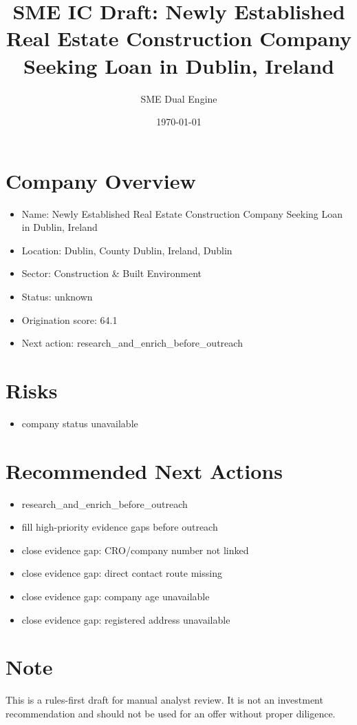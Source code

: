 \documentclass[11pt,a4paper]{article}
\title{SME IC Draft: Newly Established Real Estate Construction Company Seeking Loan in Dublin, Ireland}
\author{SME Dual Engine}
\date{\today}
\begin{document}
\maketitle
\section*{Company Overview}
\begin{itemize}[leftmargin=1.4em]
\item Name: Newly Established Real Estate Construction Company Seeking Loan in Dublin, Ireland
\item Location: Dublin, County Dublin, Ireland, Dublin
\item Sector: Construction \& Built Environment
\item Status: unknown
\item Origination score: 64.1
\item Next action: research\_and\_enrich\_before\_outreach
\end{itemize}
\section*{Risks}
\begin{itemize}[leftmargin=1.4em]
\item company status unavailable
\end{itemize}
\section*{Recommended Next Actions}
\begin{itemize}[leftmargin=1.4em]
\item research\_and\_enrich\_before\_outreach
\item fill high-priority evidence gaps before outreach
\item close evidence gap: CRO/company number not linked
\item close evidence gap: direct contact route missing
\item close evidence gap: company age unavailable
\item close evidence gap: registered address unavailable
\end{itemize}
\section*{Note}
This is a rules-first draft for manual analyst review. It is not an investment
recommendation and should not be used for an offer without proper diligence.
\end{document}
